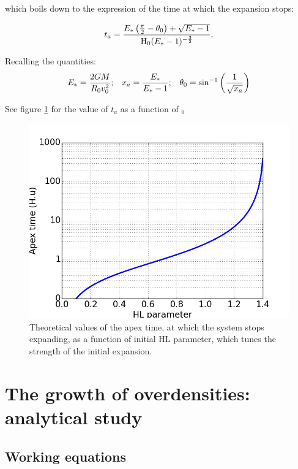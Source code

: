which boils down to the expression of the time at which the expansion stops:

\begin{equation}
t_a = \frac{E_\ast \left(\frac{\pi}{2} - \theta_0\right) + \sqrt{E_\ast-1}}{{\textrm{H}}_0 (E_\ast-1)^{-\frac{3}{2}}}.
\end{equation}

Recalling the quantities:
\begin{align}
E_\ast = \frac{2GM}{R_0 v_0^2}        &;  & x_a=\frac{E_\ast}{E_\ast-1}  &;  &\theta_0 = \sin^{-1}\left(\frac{1}{\sqrt{x_a}}\right)  
\end{align}

See figure \ref{Fig:apextime} for the value of $t_a$ as a function of \Hub$_0$

\begin{figure}
\center
\includegraphics[width=0.7\linewidth]{Figures/1_apextime.png}
\caption{Theoretical values of the apex time, at which the system stops expanding, as a function of initial HL parameter, which tunes the strength of the initial expansion.}
\label{Fig:apextime}
\end{figure} 





\section{The growth of overdensities: analytical study}



\subsection{Working equations}



